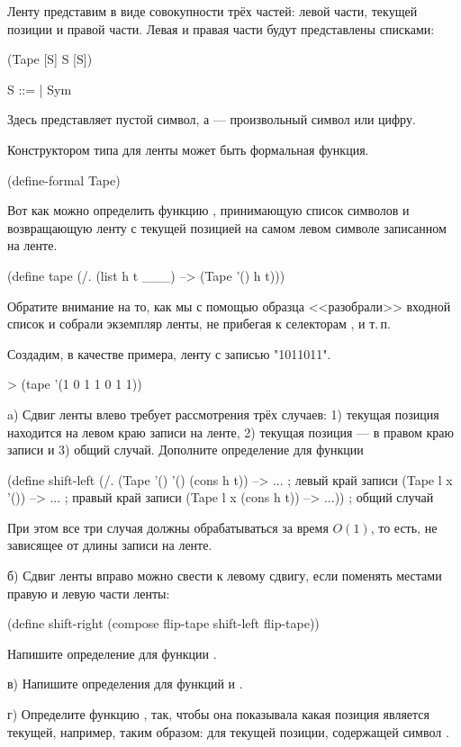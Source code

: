 Ленту представим в виде совокупности трёх частей: левой части, текущей позиции и правой части. Левая и правая части будут представлены списками:
\begin{type}
  (Tape [S] S [S])
\item S ::=  | Sym
\end{type}
Здесь  представляет пустой символ, а  --- произвольный символ или цифру.

Конструктором типа для ленты может быть формальная функция.
\begin{Definition}
  (define-formal Tape)
\end{Definition}

Вот как можно определить функцию , принимающую список символов и возвращающую ленту с текущей позицией на самом левом символе записанном на ленте.
\begin{Definition}[emph={h,t}]
  (define tape
    (/. (list h t ___) --> (Tape '() h t)))
\end{Definition}
Обратите внимание на то, как мы с помощью образца <<разобрали>> входной список и собрали экземпляр ленты, не прибегая к селекторам ,  и т.\,п.

\begin{example}{Создадим, в качестве примера, ленту с записью "1011011".}
\begin{ExampleCode}
> (tape '(1 0 1 1 0 1 1))
\end{ExampleCode}
\end{example}

\begin{Assignment}
a) Сдвиг ленты влево требует рассмотрения трёх случаев: 1) текущая позиция находится на левом краю записи на ленте, 2) текущая позиция --- в правом краю записи и 3) общий случай.
 Дополните определение для функции 
\begin{Definition}
(define shift-left
  (/. (Tape '() '() (cons h t)) --> ...   ; левый край записи
      (Tape  l x '())           --> ...   ; правый край записи
      (Tape  l x (cons h t))    --> ...)) ; общий случай
\end{Definition}
При этом все три случая должны обрабатываться за время $O(1)$, то  есть, не зависящее от длины записи на ленте.

б) Сдвиг ленты вправо можно свести к левому сдвигу, если поменять местами правую и левую части ленты:
\begin{Definition}
(define shift-right
  (compose flip-tape shift-left flip-tape))
\end{Definition}
Напишите определение для функции .

в) Напишите определения для функций  и .

г) Определите функцию , так, чтобы она показывала какая позиция является текущей, например, таким образом:  для текущей позиции, содержащей символ .
\end{Assignment}

